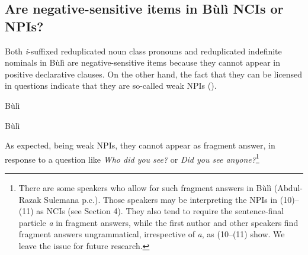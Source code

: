 \documentclass[output=paper,colorlinks,citecolor=brown]{langscibook}
\begin{document}


\subsection{Are negative-sensitive items in Bùlì NCIs or NPIs?}

Both \textit{i}-suffixed reduplicated noun class pronouns  and reduplicated indefinite nominals in Bùlì are negative-sensitive items because they cannot appear in positive declarative clauses. On the other hand, the fact that they can be licensed in questions indicate that they are so-called weak NPIs (\citealt{VanDerWouden1997}).



\ea Bùlì
\z
\z




\ea Bùlì
\z
\z

As expected, being weak NPIs, they cannot appear as fragment answer, in response to a question like \textit{Who did you see?} or \textit{Did you see anyone?}\footnote{There are some speakers who allow for such fragment answers in Bùlì (Abdul-Razak Sulemana p.c.). Those speakers may be interpreting the NPIs in (10)--(11) as NCIs (see Section 4). They also tend to require the sentence-final particle \textit{a} in fragment answers, while the first author and other speakers find fragment answers ungrammatical, irrespective of \textit{a}, as  (10--(11) show. We leave the issue for future research.}

\z
\end{document}
